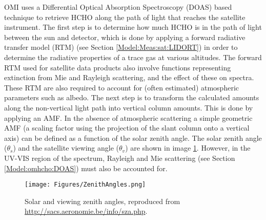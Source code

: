   OMI uses a Differential Optical Absorption Spectroscopy (DOAS) based technique to retrieve HCHO along the path of light that reaches the satellite instrument.
  The first step is to determine how much HCHO is in the path of light between the sun and detector, which is done by applying a forward radiative transfer model (RTM) (see Section \ref{Model:Meas:sat:LIDORT}) in order to determine the radiative properties of a trace gas at various altitudes.
  The forward RTM used for satellite data products also involve functions representing extinction from Mie and Rayleigh scattering, and the effect of these on spectra.
  These RTM are also required to account for (often estimated) atmospheric parameters such as albedo.
  The next step is to transform the calculated amounts along the non-vertical light path into vertical column amounts.
  This is done by applying an AMF.
  In the absence of atmospheric scattering a simple geometric AMF (a scaling factor using the projection of the slant column onto a vertical axis) can be defined as a function of the solar zenith angle. 
  The solar zenith angle ($\theta_s$) and the satellite viewing angle ($\theta_v$) are shown in image \ref{ch_HCHO:fig:zenithangle}.
  However, in the UV-VIS region of the spectrum, Rayleigh and Mie scattering (see Section \ref{Model:omhcho:DOAS}) must also be accounted for.
  
  
  \begin{figure}\begin{center}
      \texttt{[image: Figures/ZenithAngles.png]}
      \caption{Solar and viewing zenith angles, reproduced from \url{http://sacs.aeronomie.be/info/sza.php}. %
        }
      \label{ch_HCHO:fig:zenithangle}
    \end{center}\end{figure}
  

